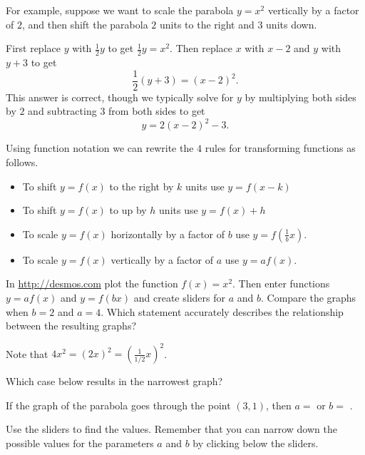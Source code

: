 \documentclass{ximera}
\begin{document}
For example, suppose we want to scale the parabola $y=x^2$ vertically by a factor of $2$, and then shift the parabola $2$ units to the right and $3$ units down.

First replace $y$ with $\frac{1}{2}y$ to get $\frac{1}{2}y=x^2$. Then replace $x$ with $x-2$ and $y$ with $y+3$ to get 
\[\frac{1}{2}(y+3)=(x-2)^2.\] 
This answer is correct, though we typically solve for $y$ by multiplying both sides by $2$ and subtracting $3$ from both sides to get
\[
y=2(x-2)^2-3.
\]

Using function notation we can rewrite the $4$ rules for transforming functions as follows.

\begin{itemize}
\item To shift $y=f(x)$ to the right by $k$ units use $y=f(x-k)$
\item To shift $y=f(x)$ to up by $h$ units use $y=f(x)+h$
\item To scale $y=f(x)$ horizontally by a factor of $b$ use $y=f(\frac{1}{b}x)$.
\item To scale $y=f(x)$ vertically by a factor of $a$ use $y=a f(x)$.
\end{itemize}

\begin{question}
In \url{http://desmos.com} plot the function $f(x)=x^2$. Then enter functions $y=af(x)$ and $y=f(bx)$ and create sliders for $a$ and $b$. Compare the graphs when $b=2$ and $a=4$. Which statement accurately describes the relationship between the resulting graphs?
  \begin{solution}
    \begin{multiple-choice}
    \end{multiple-choice}
    \begin{hint}
    Note that $4x^2=(2x)^2=\left(\frac{1}{1/2}x\right)^2$.
    \end{hint}
Which case below results in the narrowest graph?
	\begin{multiple-choice}
    \end{multiple-choice}
If the graph of the parabola goes through the point $(3,1)$, then $a=$  or $b=$ .  
	\begin{hint}
    Use the sliders to find the values. Remember that you can narrow down the possible values for the parameters $a$ and $b$ by clicking below the sliders.
    \end{hint}
  \end{solution}
\end{question}
\end{document}
